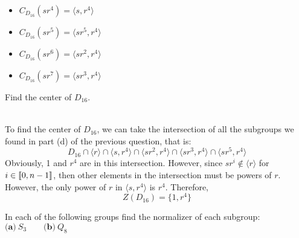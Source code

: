 \begin{solution}
\begin{enumerate}[label = \textbf{(\alph*)}]
\begin{multicols}{2}
\begin{itemize}
            \item $C_{D_{16}}(sr^4) = \langle s, r^4 \rangle$
            \item $C_{D_{16}}(sr^5) = \langle sr^5, r^4 \rangle$
            \item $C_{D_{16}}(sr^6) = \langle sr^2, r^4 \rangle$
            \item $C_{D_{16}}(sr^7) = \langle sr^3, r^4 \rangle$
        \end{itemize}
        \end{multicols}
    \end{enumerate}
\end{solution}

\begin{exercise}
    Find the center of $D_{16}$.\\
\end{exercise}

\begin{solution}
    \\ To find the center of $D_{16}$, we can take the intersection of all the subgroups we found in part (d) of the previous question, that is:
    $$D_{16}\cap \langle r \rangle \cap \langle s, r^4 \rangle \cap \langle sr^2, r^4 \rangle \cap \langle sr^3, r^4 \rangle \cap \langle sr^5, r^4 \rangle$$
    Obviously, 1 and $r^4$ are in this intersection. However, since $sr^i \notin \langle r \rangle$ for $i \in \llbracket 0 , n-1 \rrbracket$, then other elements in the intersection must be powers of $r$. However, the only power of $r$ in $\langle s, r^4 \rangle$ is $r^4$. Therefore,
    $$Z(D_{16}) = \{1, r^4\}$$
\end{solution}

\begin{exercise}
    In each of the following groups find the normalizer of each subgroup:\\
    $\textbf{(a)} \ S_3 \qquad \textbf{(b)} \ Q_8$ \\
\end{exercise}

